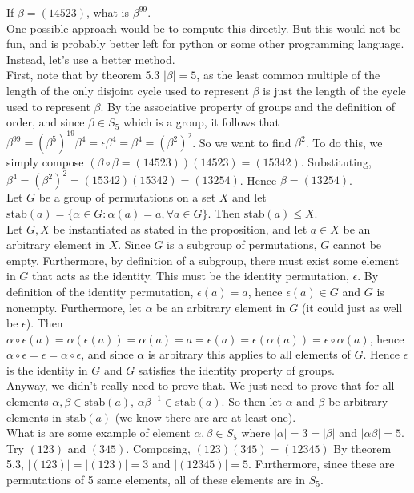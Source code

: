 \documentclass{article}
\newcommand{\stab}{\mbox{stab}}
\begin{document}
 If $\beta = (14523)$, what is $\beta^99$.\\
 One possible approach would be to compute this directly. But this would not be fun, and is probably better left for python or some other programming language. Instead, let's use a better method.\\
First, note that by theorem 5.3 $|\beta| = 5$, as the least common multiple of the length of the only disjoint cycle used to represent $\beta$ is just the length of the cycle used to represent $\beta$. By the associative property of groups and the definition of order, and since $\beta\in S_5$ which is a group, it follows that $\beta^{99} = (\beta^5)^{19}\beta^4 = \epsilon\beta^4 = \beta^4 = (\beta^2)^2$. So we want to find $\beta^2$. To do this, we simply compose $(\beta\circ \beta = (14523))(14523) = (15342).$ Substituting, $\beta^4 = (\beta^2)^2 = (15342)(15342) = (13254)$. Hence $\beta = (13254)$.\\

 Let $G$ be a group of permutations on a set $X$ and let $\stab(a) = \{\alpha\in G : \alpha(a) = a, \forall a\in G\}$. Then $\stab(a)\le X$.\\

 Let $G,X$ be instantiated as stated in the proposition, and let $a\in X$ be an arbitrary element in $X$. Since $G$ is a subgroup of permutations, $G$ cannot be empty. Furthermore, by definition of a subgroup, there must exist some element in $G$ that acts as the identity. This must be the identity permutation, $\epsilon$. By definition of the identity permutation, $\epsilon(a) = a$, hence $\epsilon(a)\in G$ and $G$ is nonempty. Furthermore, let $\alpha$ be an arbitrary element in $G$ (it could just as well be $\epsilon$). Then $\alpha\circ\epsilon(a) = \alpha(\epsilon(a)) = \alpha(a) = a = \epsilon(a) = \epsilon(\alpha(a)) = \epsilon\circ\alpha(a)$, hence $\alpha\circ\epsilon = \epsilon = \alpha\circ\epsilon$, and since $\alpha$ is arbitrary this applies to all elements of $G$. Hence $\epsilon$ is the identity in $G$ and $G$ satisfies the identity property of groups. \\
Anyway, we didn't really need to prove that. We just need to prove that for all elements $\alpha,\beta\in \stab(a)$, $\alpha\beta^{-1}\in \stab(a)$. So then let $\alpha$ and $\beta$ be arbitrary elements in $\stab(a)$ (we know there are are at least one). \\


 What is are some example of element $\alpha,\beta\in S_5$ where $|\alpha| = 3 = |\beta|$ and $|\alpha\beta| = 5$.\\
 Try $(123)$ and $(345)$. Composing, $(123)(345) = (12345)$ By theorem 5.3, $|(123)| = |(123)| = 3$ and $|(12345)| = 5$. Furthermore, since these are permutations of 5 same elements, all of these elements are in $S_5$.\\
\end{document}

